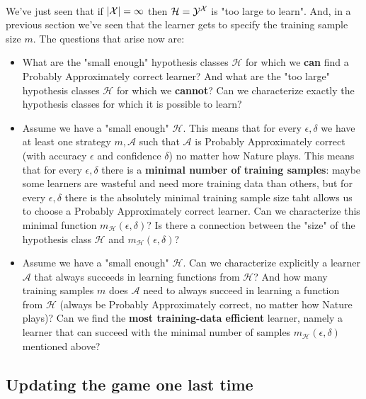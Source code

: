 \documentclass[11pt]{article}
\newcommand{\Ac}{\mathcal{A}}
\newcommand{\Hc}{\mathcal{H}}
\begin{document}
~\\
 We've just seen that if $|\mathcal{X}|=\infty$ then $\Hc   = \Y^\X$ is "too large to learn".
 And, in a previous section we've seen that the learner gets to specify the training sample size $m$. 
The questions that arise now are:
\begin{itemize}
    \item What are the "small enough" hypothesis classes $\Hc$ for which we {\bf can} find a Probably Approximately correct learner?
    And what are the "too large" hypothesis classes $\Hc$ for which we {\bf cannot}? Can we characterize exactly the hypothesis classes for which it is possible to learn?
     \item Assume we have a "small enough" $\Hc$. This means that for every
       $\epsilon,\delta$ we have at least one strategy $m,\Ac$ such that $\Ac$
       is Probably Approximately correct (with accuracy $\epsilon$ and
       confidence $\delta$) no matter how Nature plays. This means that for
       every $\epsilon,\delta$ there is a {\bf minimal number of training
       samples}: maybe some learners are wasteful and need more training data
       than others, but for every $\epsilon,\delta$ there is the absolutely
       minimal training sample size taht allows us to choose a Probably Approximately correct learner. Can we characterize this minimal function 
     $m_\Hc(\epsilon,\delta)$? Is there a connection between the "size" of the hypothesis class $\Hc$ and
     $m_\Hc(\epsilon,\delta)$?
     \item Assume we have a "small enough" $\Hc$. Can we characterize explicitly a learner $\Ac$ that always succeeds in learning functions from $\Hc$? And how many training samples $m$ does $\Ac$ need to always succeed in learning a function from $\Hc$ (always be Probably Approximately correct, no matter how Nature plays)? Can we find the {\bf most training-data efficient} learner, namely a learner that can succeed with the minimal number of samples $m_\Hc(\epsilon,\delta)$ mentioned above?
 \end{itemize}
 
 
 \subsection{Updating the game one last time}
\end{document}
